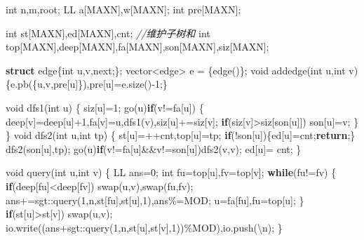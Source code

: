 \documentclass[
]{article}
\newenvironment{Shaded}{}{}
\newcommand{\CharTok}[1]{\textcolor[rgb]{0.25,0.44,0.63}{#1}}
\newcommand{\CommentTok}[1]{\textcolor[rgb]{0.38,0.63,0.69}{\textit{#1}}}
\newcommand{\ControlFlowTok}[1]{\textcolor[rgb]{0.00,0.44,0.13}{\textbf{#1}}}
\newcommand{\DataTypeTok}[1]{\textcolor[rgb]{0.56,0.13,0.00}{#1}}
\newcommand{\DecValTok}[1]{\textcolor[rgb]{0.25,0.63,0.44}{#1}}
\newcommand{\KeywordTok}[1]{\textcolor[rgb]{0.00,0.44,0.13}{\textbf{#1}}}
\newcommand{\NormalTok}[1]{#1}
\newcommand{\SpecialCharTok}[1]{\textcolor[rgb]{0.25,0.44,0.63}{#1}}
\begin{document}
\begin{Shaded}
\begin{Highlighting}[]
\DataTypeTok{int}\NormalTok{ n,m,root;}
\NormalTok{LL  a[MAXN],w[MAXN];}
\DataTypeTok{int}\NormalTok{ pre[MAXN];}

\DataTypeTok{int}\NormalTok{ st[MAXN],ed[MAXN],cnt; }\CommentTok{//维护子树和}
\DataTypeTok{int}\NormalTok{ top[MAXN],deep[MAXN],fa[MAXN],son[MAXN],siz[MAXN];}

\KeywordTok{struct}\NormalTok{ edge\{}\DataTypeTok{int}\NormalTok{ u,v,next;\};}
\NormalTok{vector\textless{}edge\textgreater{} e = \{edge()\};}
\DataTypeTok{void}\NormalTok{ addedge(}\DataTypeTok{int}\NormalTok{ u,}\DataTypeTok{int}\NormalTok{ v)\{e.pb(\{u,v,pre[u]\}),pre[u]=e.size(){-}}\DecValTok{1}\NormalTok{;\}}

\DataTypeTok{void}\NormalTok{ dfs1(}\DataTypeTok{int}\NormalTok{ u)}
\NormalTok{\{}
\NormalTok{    siz[u]=}\DecValTok{1}\NormalTok{;}
\NormalTok{    go(u)}\ControlFlowTok{if}\NormalTok{(v!=fa[u])}
\NormalTok{    \{}
\NormalTok{        deep[v]=deep[u]+}\DecValTok{1}\NormalTok{,fa[v]=u,dfs1(v),siz[u]+=siz[v];}
        \ControlFlowTok{if}\NormalTok{(siz[v]\textgreater{}siz[son[u]]) son[u]=v;}
\NormalTok{    \}}
\NormalTok{\}}
\DataTypeTok{void}\NormalTok{ dfs2(}\DataTypeTok{int}\NormalTok{ u,}\DataTypeTok{int}\NormalTok{ tp)}
\NormalTok{\{}
\NormalTok{    st[u]=++cnt,top[u]=tp;}
    \ControlFlowTok{if}\NormalTok{(!son[u])\{ed[u]=cnt;}\ControlFlowTok{return}\NormalTok{;\}}
\NormalTok{    dfs2(son[u],tp);}
\NormalTok{    go(u)}\ControlFlowTok{if}\NormalTok{(v!=fa[u]\&\&v!=son[u])dfs2(v,v);}
\NormalTok{    ed[u]=  cnt;}
\NormalTok{\}}

\DataTypeTok{void}\NormalTok{ query(}\DataTypeTok{int}\NormalTok{ u,}\DataTypeTok{int}\NormalTok{ v)}
\NormalTok{\{}
\NormalTok{    LL ans=}\DecValTok{0}\NormalTok{;}
    \DataTypeTok{int}\NormalTok{ fu=top[u],fv=top[v];}
    \ControlFlowTok{while}\NormalTok{(fu!=fv)}
\NormalTok{    \{}
        \ControlFlowTok{if}\NormalTok{(deep[fu]\textless{}deep[fv])}
\NormalTok{            swap(u,v),swap(fu,fv);}
\NormalTok{        ans+=sgt::query(}\DecValTok{1}\NormalTok{,n,st[fu],st[u],}\DecValTok{1}\NormalTok{),ans\%=MOD;}
\NormalTok{        u=fa[fu],fu=top[u];}
\NormalTok{    \}}
    \ControlFlowTok{if}\NormalTok{(st[u]\textgreater{}st[v]) swap(u,v);}
\NormalTok{    io.write((ans+sgt::query(}\DecValTok{1}\NormalTok{,n,st[u],st[v],}\DecValTok{1}\NormalTok{))\%MOD),io.push(}\CharTok{\textquotesingle{}}\SpecialCharTok{\textbackslash{}n}\CharTok{\textquotesingle{}}\NormalTok{);}
\NormalTok{\}}


\end{Highlighting}
\end{Shaded}
\end{document}

